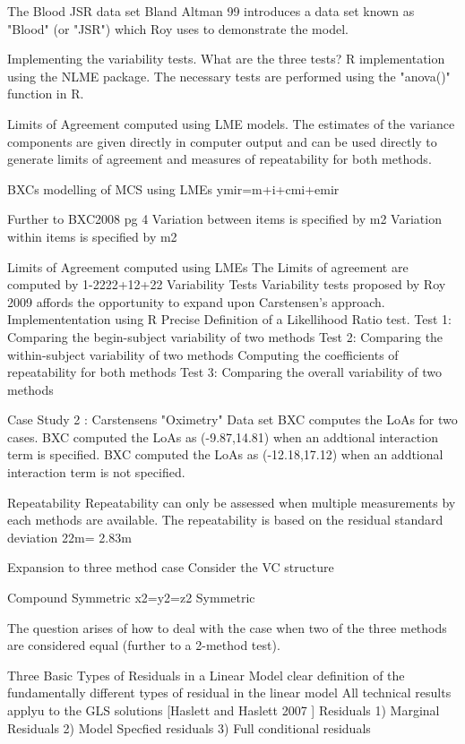 The Blood JSR data set
Bland Altman 99 introduces a data set known as "Blood" (or "JSR") which Roy uses to demonstrate the model.
 
Implementing the variability tests.
What are the three tests?
R implementation using the NLME package. 
The necessary tests are performed using the "anova()" function in R. 
 
Limits of Agreement computed using LME models.
The estimates of the variance components are given directly in computer output and can be used directly to generate
limits of agreement and measures of repeatability for both methods.

BXCs modelling of MCS using LMEs
ymir=m+i+cmi+emir
 
Further to BXC2008 pg 4
Variation between items is  specified by m2
Variation within items is  specified by m2
 
Limits of Agreement computed using LMEs
The Limits of agreement are computed by 1-2222+12+22
Variability Tests
Variability tests proposed by Roy 2009 affords the opportunity to expand upon Carstensen's approach.
Implemententation using R
Precise Definition of a Likellihood Ratio test.
Test 1: Comparing the begin-subject variability of two methods
Test 2: Comparing the within-subject variability of two methods
Computing the coefficients of repeatability for both methods
Test 3: Comparing the overall variability of two methods 
 
Case Study 2 : Carstensens "Oximetry" Data set
BXC computes the LoAs for two cases.
BXC computed the LoAs as (-9.87,14.81) when an addtional interaction term is specified.
BXC computed the LoAs as (-12.18,17.12) when an addtional interaction term is not specified.
 
Repeatability
Repeatability can only be assessed when multiple measurements by each methods are available.
The repeatability is based on the residual standard deviation 22m= 2.83m
 
Expansion to three method case
Consider the VC structure
 
Compound Symmetric     	x2=y2=z2
Symmetric                        
 
The question arises of how to deal with the case when two of the three methods are considered equal (further to a 2-method test). 

Three Basic Types of Residuals in a Linear Model
clear definition of the fundamentally different types of residual in the linear model
All technical results applyu to the GLS solutions
[Haslett and Haslett 2007 ]
Residuals
1) Marginal Residuals
2) Model Specfied residuals
3) Full conditional residuals

